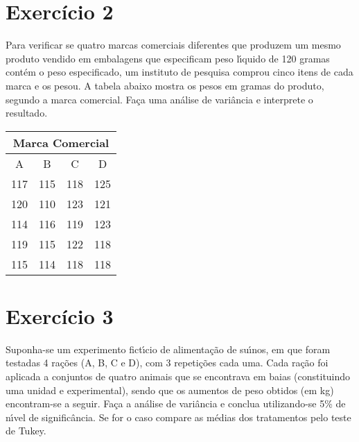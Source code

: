 \documentclass[a4paper,11pt,twoside,openright]{report}
\begin{document}
\section*{Exerc\'icio 2}
\hspace{0.5cm}Para verificar se quatro marcas comerciais diferentes que produzem um mesmo produto vendido em embalagens que especificam peso
l\'{\i}quido de 120 gramas cont\'{e}m o peso especificado, um instituto de pesquisa comprou cinco itens de cada marca e os pesou. A tabela abaixo
mostra os pesos em gramas do produto, segundo a marca comercial. Fa\c{c}a uma an\'{a}lise de vari\^{a}ncia e interprete o resultado.

\begin{center}
\begin{tabular}{l|l|l|l}
\hline
\multicolumn{4}{c}{Marca Comercial} \\ 
\hline
\multicolumn{1}{c|}{A} & \multicolumn{1}{c|}{B} & \multicolumn{1}{c|}{C} & \multicolumn{1}{c}{D} \\ 
\hline
\multicolumn{1}{c|}{117} & \multicolumn{1}{c|}{115} & \multicolumn{1}{c|}{118} & \multicolumn{1}{c}{125} \\ 
\multicolumn{1}{c|}{120} & \multicolumn{1}{c|}{110} & \multicolumn{1}{c|}{123} & \multicolumn{1}{c}{121} \\ 
\multicolumn{1}{c|}{114} & \multicolumn{1}{c|}{116} & \multicolumn{1}{c|}{119} & \multicolumn{1}{c}{123} \\ 
\multicolumn{1}{c|}{119} & \multicolumn{1}{c|}{115} & \multicolumn{1}{c|}{122} & \multicolumn{1}{c}{118} \\ 
\multicolumn{1}{c|}{115} & \multicolumn{1}{c|}{114} & \multicolumn{1}{c|}{118} & \multicolumn{1}{c}{118} \\ 
\hline
\end{tabular}
\end{center}

\section*{Exerc\'icio 3}
\hspace{0.5cm}Suponha-se um experimento fict\'{\i}cio de alimenta\c{c}\~{a}o de su\'{\i}nos, em que foram testadas 4 ra\c{c}\~{o}es (A, B, C e D), 
com 3 repeti\c{c}\~{o}es cada uma.  Cada ra\c{c}\~{a}o foi aplicada a conjuntos de quatro animais que se encontrava em baias (constituindo uma unidad
e experimental), sendo que os aumentos de peso obtidos (em kg) encontram-se a seguir.  Fa\c{c}a a an\'{a}lise de vari\^{a}ncia e conclua utilizando-se 5\%
de n\'{\i}vel de signific\^{a}ncia.  Se for o caso compare as m\'{e}dias dos tratamentos pelo teste de Tukey.
\end{document}
